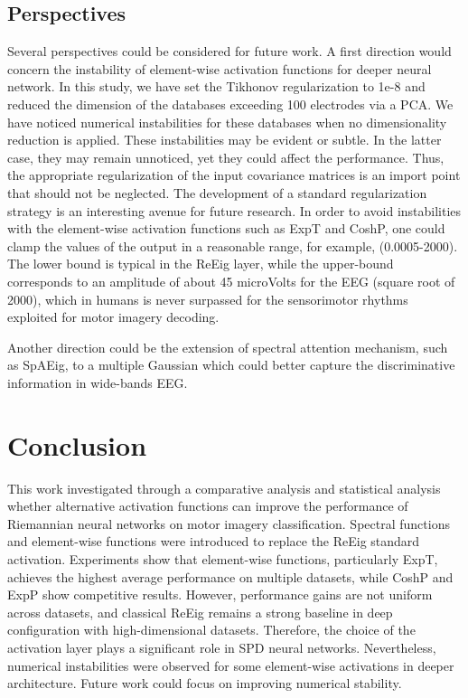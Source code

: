 \documentclass[11pt,a4paper]{article}
\begin{document}
\subsection{Perspectives}
Several perspectives could be considered for future work. A first direction would concern the instability of element-wise activation functions for deeper neural network. 
In this study, we have set the Tikhonov regularization to 1e-8 and reduced the dimension of the databases exceeding 100 electrodes via a PCA. We have noticed numerical instabilities for these databases when no dimensionality reduction is applied. These instabilities may be evident or subtle.
In the latter case, they may remain unnoticed, yet they could affect the performance. Thus, the appropriate regularization of the input covariance matrices is an import point that should not be neglected. 
The development of a standard regularization strategy is an interesting avenue for future research.
In order to avoid instabilities with the element-wise activation functions such as ExpT and CoshP, one could clamp the values of the output in a reasonable range, for example, (0.0005-2000). The lower bound is typical in the ReEig layer, while the upper-bound corresponds to an amplitude of about 45 microVolts for the EEG (square root of 2000), which in humans is never surpassed for the sensorimotor rhythms exploited for motor imagery decoding.

\noindent Another direction could be the extension of spectral attention mechanism, such as SpAEig, to a multiple Gaussian which could better capture the discriminative information in wide-bands EEG. 
 

\newpage
\section{Conclusion}
This work investigated through a comparative analysis and statistical analysis whether alternative activation functions can improve the performance of Riemannian neural networks on motor imagery classification. Spectral functions and element-wise functions were introduced to replace the ReEig standard activation. Experiments show that element-wise functions, particularly ExpT, achieves the highest average performance on multiple datasets, while CoshP and ExpP show competitive results. However, performance gains are not uniform across datasets, and classical ReEig remains a strong baseline in deep configuration with high-dimensional datasets. Therefore, the choice of the activation layer plays a significant role in SPD neural networks. Nevertheless, numerical instabilities were observed for some element-wise activations in deeper architecture. 
Future work could focus on improving numerical stability.
\end{document}

